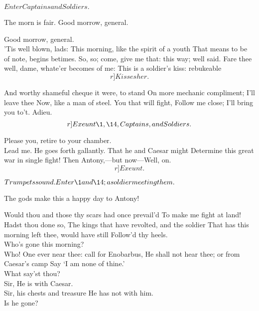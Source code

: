 \documentclass{book}
\begin{document}
	\(Enter Captains and Soldiers.\)

	The morn is fair. Good morrow, general.

	Good morrow, general. \\

\1	'Tis well blown, lads:
	This morning, like the spirit of a youth
	That means to be of note, begins betimes.
	So, so; come, give me that: this way; well said.
	Fare thee well, dame, whate'er becomes of me:
	This is a soldier's kiss: rebukeable \[r]Kisses her.\]

	And worthy shameful cheque it were, to stand
	On more mechanic compliment; I'll leave thee
	Now, like a man of steel. You that will fight,
	Follow me close; I'll bring you to't. Adieu.
  \[r]Exeunt \1, \14, Captains, and Soldiers.\]

\7	Please you, retire to your chamber. \\

\2	Lead me.
	He goes forth gallantly. That he and Caesar might
	Determine this great war in single fight!
	Then Antony,---but now---Well, on. \[r]Exeunt.\]



	\(Trumpets sound. Enter \1 and \14; a soldier meeting them.\)

	The gods make this a happy day to Antony!

\1	Would thou and those thy scars had once prevail'd
	To make me fight at land! \\

	Hadst thou done so,
	The kings that have revolted, and the soldier
	That has this morning left thee, would have still
	Follow'd thy heels. \\

\1	Who's gone this morning? \\

	Who!
	One ever near thee: call for Enobarbus,
	He shall not hear thee; or from Caesar's camp
	Say `I am none of thine.' \\

\1	What say'st thou? \\

	Sir,
	He is with Caesar. \\

	                  Sir, his chests and treasure
	He has not with him. \\

\1	Is he gone? \\
\end{document}
